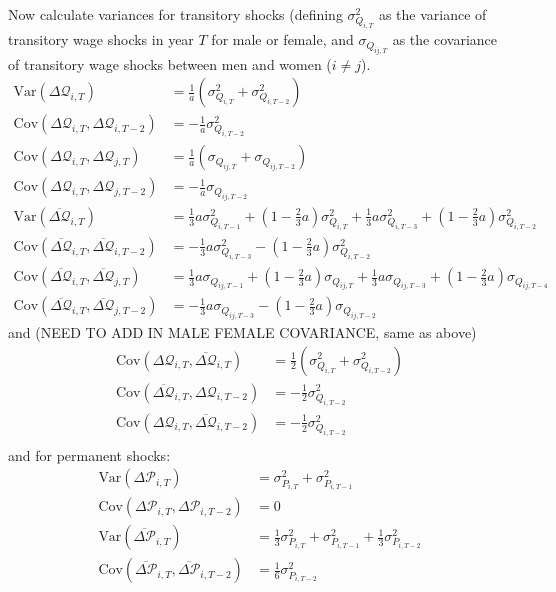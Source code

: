 \documentclass[]{article}
\begin{document}
Now calculate variances for transitory shocks (defining $\sigma^2_{Q_{i,T}}$ as the variance of transitory wage shocks in year $T$ for male or female, and $\sigma_{Q_{ij,T}}$ as the covariance of transitory wage shocks between men and women ($i \neq j$).
\begin{align*}
\text{Var}(\Delta \mathcal{Q}_{i,T}) &=  \frac{1}{a}\left(\sigma^2_{Q_{i,T}}  + \sigma^2_{Q_{i,T-2}}  \right)\\
\text{Cov}(\Delta \mathcal{Q}_{i,T}, \Delta \mathcal{Q}_{i,T-2}) &= - \frac{1}{a} \sigma^2_{Q_{i,T-2}} \\
\text{Cov}(\Delta \mathcal{Q}_{i,T},\Delta \mathcal{Q}_{j,T}) &=  \frac{1}{a}\left(\sigma_{Q_{ij,T}}  + \sigma_{Q_{ij,T-2}}  \right)\\
\text{Cov}(\Delta \mathcal{Q}_{i,T}, \Delta \mathcal{Q}_{j,T-2}) &= - \frac{1}{a} \sigma_{Q_{ij,T-2}} \\
\text{Var}(\overline{\Delta \mathcal{Q}}_{i,T}) &= \frac{1}{3}a\sigma^2_{Q_{i,T-1}} + (1-\frac{2}{3} a)\sigma^2_{Q_{i,T}} +\frac{1}{3}a\sigma^2_{Q_{i,T-3}} + (1-\frac{2}{3} a)\sigma^2_{Q_{i,T-2}}\\
\text{Cov}(\overline{\Delta \mathcal{Q}}_{i,T},\overline{ \Delta \mathcal{Q}}_{i,T-2}) &=   -\frac{1}{3}a\sigma^2_{Q_{i,T-3}} - (1-\frac{2}{3} a)\sigma^2_{Q_{i,T-2}}\\
\text{Cov}(\overline{\Delta \mathcal{Q}}_{i,T},\overline{\Delta \mathcal{Q}}_{j,T}) &= \frac{1}{3}a\sigma_{Q_{ij,T-1}} + (1-\frac{2}{3} a)\sigma_{Q_{ij,T}} +\frac{1}{3}a\sigma_{Q_{ij,T-3}} + (1-\frac{2}{3} a)\sigma_{Q_{ij,T-4}}\\
\text{Cov}(\overline{\Delta \mathcal{Q}}_{i,T},\overline{ \Delta \mathcal{Q}}_{j,T-2}) &=   -\frac{1}{3}a\sigma_{Q_{ij,T-3}} - (1-\frac{2}{3} a)\sigma_{Q_{ij,T-2}}
\end{align*}
and (NEED TO ADD IN MALE FEMALE COVARIANCE, same as above)
\begin{align*}
\text{Cov}(\Delta \mathcal{Q}_{i,T},\overline{\Delta \mathcal{Q}}_{i,T}) &= \frac{1}{2}(\sigma^2_{Q_{i,T}} + \sigma^2_{Q_{i,T-2}}) \\
\text{Cov}(\overline{\Delta \mathcal{Q}}_{i,T}, \Delta \mathcal{Q}_{i,T-2}) &= - \frac{1}{2} \sigma^2_{Q_{i,T-2}} \\
\text{Cov}( \Delta \mathcal{Q}_{i,T}, \overline{\Delta \mathcal{Q}}_{i,T-2}) &=  - \frac{1}{2} \sigma^2_{Q_{i,T-2}}\\
\end{align*}
and for permanent shocks:
\begin{align*}
\text{Var}(\Delta \mathcal{P}_{i,T}) &=   \sigma^2_{P_{i,T}} +  \sigma^2_{P_{i,T-1}}\\
\text{Cov}(\Delta \mathcal{P}_{i,T}, \Delta \mathcal{P}_{i,T-2}) &= 0 \\
\text{Var}(\overline{\Delta \mathcal{P}}_{i,T}) &= \frac{1}{3} \sigma^2_{P_{i,T}} +  \sigma^2_{P_{i,T-1}} +\frac{1}{3} \sigma^2_{P_{i,T-2}}  \\
\text{Cov}(\overline{\Delta \mathcal{P}}_{i,T},\overline{ \Delta \mathcal{P}}_{i,T-2}) &= \frac{1}{6} \sigma^2_{P_{i,T-2}} 
\end{align*}
\end{document}
